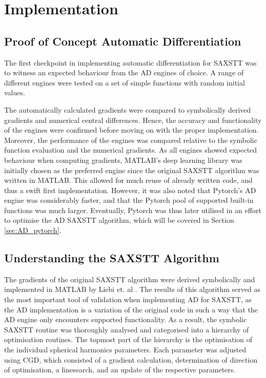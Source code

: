 
\chapter{Implementation}

\section{Proof of Concept Automatic Differentiation}\label{sec:proof_of_concept_AD}

The first checkpoint in implementing automatic differentiation for SAXSTT was to witness an expected behaviour from the AD engines of choice.
A range of different engines were tested on a set of simple functions with random initial values.

The automatically calculated gradients were compared to symbolically derived gradients and numerical central differences.
Hence, the accuracy and functionality of the engines were confirmed before moving on with the proper implementation.
Moreover, the performance of the engines was compared relative to the symbolic function evaluation and the numerical gradients.
As all engines showed expected behaviour when computing gradients,
MATLAB's deep learning library was initially chosen as the preferred engine since the original SAXSTT algorithm was written in MATLAB.
This allowed for much reuse of already written code, and thus a swift first implementation.
However, it was also noted that Pytorch's AD engine was considerably faster, and that the Pytorch pool of supported built-in functions was much larger.
Eventually, Pytorch was thus later utilised in an effort to optimise the AD SAXSTT algorithm, which will be covered in Section \ref{sec:AD_pytorch}.


\section{Understanding the SAXSTT Algorithm}\label{sec:understanding_SAXSTT}
The gradients of the original SAXSTT algorithm were derived symbolically and implemented in MATLAB by Liebi et. al \cite{liebi2015nanostructure}.
The results of this algorithm served as the most important tool of validation when implementing AD for SAXSTT,
as the AD implementation is a variation of the original code in such a way that the AD engine only encounters supported functionality.
As a result, the symbolic SAXSTT routine was thoroughly analysed and categorised into a hierarchy of optimisation routines. %
The topmost part of the hierarchy is the optimisation of the individual spherical harmonics parameters.
Each parameter was adjusted using CGD,
which consisted of a gradient calculation, determination of direction of optimisation, a linesearch, and an update of the respective parameters.

